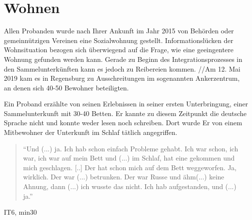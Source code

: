 \section{Wohnen}
Allen Probanden wurde nach Ihrer Ankunft im Jahr 2015 von Behörden oder gemeinnützigen Vereinen eine Sozialwohnung gestellt. Informationslücken der Wohnsituation bezogen sich überwiegend auf die Frage, wie eine geeingentere Wohnung gefunden werden kann. Gerade zu Beginn des Integrationsprozesses in den Sammelunterkünften kann es jedoch zu Reibereien kommen. 
//Am 12. Mai 2019 kam es in Regensburg zu Ausschreitungen im sogenannten Ankerzentrum, an denen sich 40-50 Bewohner beteiligten.

Ein Proband erzählte von seinen Erlebnissen in seiner ersten Unterbringung, einer Sammelunterkunft mit 30-40 Betten. Er kannte zu diesem Zeitpunkt die deutsche Sprache nicht und konnte weder lesen noch schreiben. Dort wurde Er von einem Mitbewohner der Unterkunft im Schlaf tätlich angegriffen.

\begin{quote}
    ``Und (...) ja. Ich hab schon einfach Probleme gehabt. Ich war schon, ich war, ich war auf mein Bett und (...) im Schlaf, hat eine gekommen und mich geschlagen. [..] Der hat schon mich auf dem Bett weggeworfen. Ja, wirklich. Der war (...) betrunken. Der war Russe und ähm(...) keine Ahnung, dann (...) ich wusste das nicht. Ich hab aufgestanden, und (...) ja.''
\end{quote}
\caption{IT6, min30}

